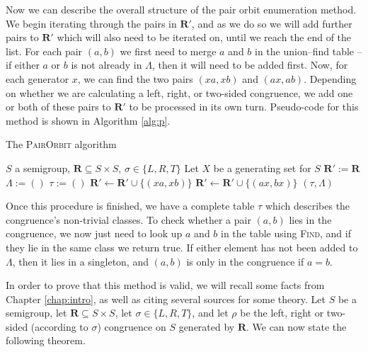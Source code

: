 Now we can describe the overall structure of the pair orbit enumeration method.
We begin iterating through the pairs in $\mathbf{R}'$, and as we do so we
will add further pairs to $\mathbf{R}'$ which will also need to be iterated on,
until we reach the end of the list.  For each pair $(a,b)$ we first need to
merge $a$ and $b$ in the union--find table -- if either $a$ or $b$ is not
already in $\Lambda$, then it will need to be added first.  Now,
for each generator $x$, we can find the two pairs $(xa,xb)$ and $(ax,ab)$.
Depending on whether we are calculating a left, right, or two-sided congruence,
we add one or both of these pairs to $\mathbf{R}'$ to be processed in its own
turn.  Pseudo-code for this method is shown in Algorithm \ref{alg:p}.

\begin{algorithm}
\caption{The \textsc{PairOrbit} algorithm}
\label{alg:p}
\begin{algorithmic}[1]
\Require $S$ a semigroup,
         $\mathbf{R} \subseteq S \times S$,
         $\sigma \in \{L, R, T\}$
\State Let $X$ be a generating set for $S$
\State $\mathbf{R}' := \mathbf{R}$
\State $\Lambda := ()$ 
\State $\tau := ()$ 
    \State {}
  \EndIf
    \State {}
  \EndIf
  \State {}
      \State $\mathbf{R}' \gets \mathbf{R}' \cup \{(xa, xb)\}$
    \EndIf
      \State $\mathbf{R}' \gets \mathbf{R}' \cup \{(ax, bx)\}$
    \EndIf
  \EndFor
\EndFor
\State \Return $(\tau, \Lambda)$
\EndProcedure
\end{algorithmic}
\end{algorithm}

Once this procedure is finished, we have a complete table $\tau$ which describes
the congruence's non-trivial classes.  To check whether a pair $(a,b)$ lies in
the congruence, we now just need to look up $a$ and $b$ in the table using
\textsc{Find}, and if they lie in the same class we return true.  If either
element has not been added to $\Lambda$, then it lies in a singleton, and $(a,b)$
is only in the congruence if $a=b$.

In order to prove that this method is valid, we will recall some facts from
Chapter \ref{chap:intro}, as well as citing several sources for some theory.
Let $S$ be a semigroup, let $\mathbf{R} \subseteq S \times S$, let
$\sigma \in \{L, R, T\}$, and let $\rho$ be the left, right or two-sided
(according to $\sigma$) congruence on $S$ generated by $\mathbf{R}$.  We can now
state the following theorem.

